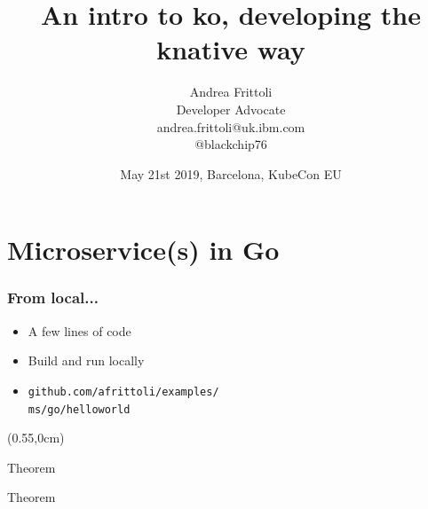 \documentclass[aspectratio=169,11pt,hyperref={colorlinks=true}]{beamer}
\title{An intro to ko, developing the knative way}
\date[KubeCon EU 2019]{May 21st 2019, Barcelona, KubeCon EU}
\author[Andrea]{
  Andrea Frittoli \\
  Developer Advocate \\
  andrea.frittoli@uk.ibm.com \\
  @blackchip76
}
\begin{document}
\begin{frame}[noframenumbering]
\titlepage{}
\end{frame}

\section{Microservice(s) in Go}

\begin{lgrayrwhiteframe}
  \frametitle{From local...}
  \large
  \begin{itemize}
    \item A few lines of code
    \item Build and run locally
    \item \small\texttt{github.com/afrittoli/examples/} \\
    \texttt{ms/go/helloworld}
  \end{itemize}
  \begin{textblock*}{0.4\paperwidth}(0.55\paperwidth,0cm)
    \begin{beamercolorbox}[leftskip=1cm,rightskip=1cm,rounded=true,sep=2.5ex]{Theorem}
        
    \end{beamercolorbox}
    \begin{beamercolorbox}[leftskip=1cm,rightskip=1cm,rounded=true]{Theorem}
        
    \end{beamercolorbox}
  \end{textblock*}
\end{lgrayrwhiteframe}
\end{document}
